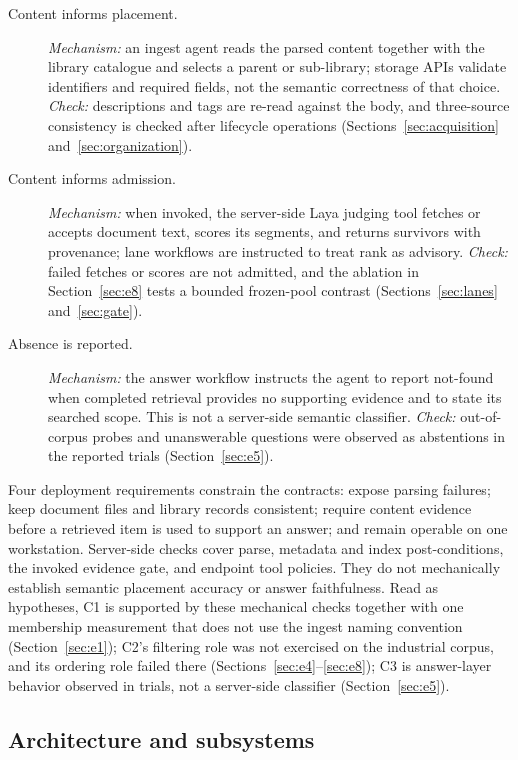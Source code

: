 \begin{description}
\item[Content informs placement.] \emph{Mechanism:} an ingest agent reads the
parsed content together with the library catalogue and selects a parent or
sub-library; storage APIs validate identifiers and required fields, not the
semantic correctness of that choice. \emph{Check:} descriptions and tags are
re-read against the body, and three-source consistency is checked after
lifecycle operations (Sections~\ref{sec:acquisition} and~\ref{sec:organization}).
\item[Content informs admission.] \emph{Mechanism:} when invoked, the server-side
Laya judging tool fetches or accepts document text, scores its segments, and
returns survivors with provenance; lane workflows are instructed to treat rank
as advisory. \emph{Check:} failed fetches or scores are not admitted, and the
ablation in Section~\ref{sec:e8} tests a bounded frozen-pool contrast
(Sections~\ref{sec:lanes} and~\ref{sec:gate}).
\item[Absence is reported.] \emph{Mechanism:} the answer workflow instructs the
agent to report not-found when completed retrieval provides no supporting
evidence and to state its searched scope. This is not a server-side semantic
classifier. \emph{Check:} out-of-corpus probes and unanswerable questions were
observed as abstentions in the reported trials (Section~\ref{sec:e5}).
\end{description}

Four deployment requirements constrain the contracts: expose parsing failures;
keep document files and library records consistent; require content evidence
before a retrieved item is used to support an answer; and remain operable on
one workstation. Server-side checks cover parse, metadata and index
post-conditions, the invoked evidence gate, and endpoint tool policies. They do
not mechanically establish semantic placement accuracy or answer faithfulness.
Read as hypotheses, C1 is supported by these mechanical checks together with
one membership measurement that does not use the ingest naming convention
(Section~\ref{sec:e1}); C2's filtering role was not exercised on the
industrial corpus, and its ordering role failed there
(Sections~\ref{sec:e4}--\ref{sec:e8}); C3 is answer-layer behavior observed in
trials, not a server-side classifier (Section~\ref{sec:e5}).

\subsection{Architecture and subsystems}
\label{sec:architecture}

